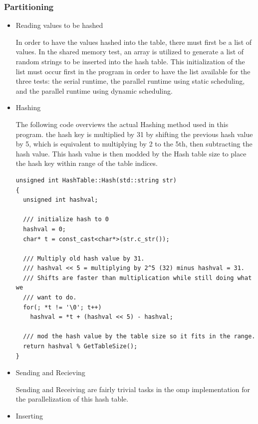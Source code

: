 \documentclass{article}
\begin{document}
\subsubsection{Partitioning}
        \begin{itemize}
            \item Reading values to be hashed
            
            In order to have the values hashed into the table, there must first be a list of values. In the shared memory test, 
            an array is utilized to generate a list of random strings to be inserted into the hash table. This initialization of 
            the list must occur first in the program in order to have the list available for the three tests: the serial runtime, 
            the parallel runtime using static scheduling, and the parallel runtime using dynamic scheduling.
            \item Hashing
            
            The following code overviews the actual Hashing method used in this program. the hash key is multiplied by 31 by 
            shifting the previous hash value by 5, which is equivalent to multiplying by 2 to the 5th, then subtracting the hash value. 
            This hash value is then modded by the Hash table size to place the hash key within range of the table indices.
            \begin{lstlisting}
unsigned int HashTable::Hash(std::string str)
{
  unsigned int hashval;

  /// initialize hash to 0
  hashval = 0;
  char* t = const_cast<char*>(str.c_str());

  /// Multiply old hash value by 31.
  /// hashval << 5 = multiplying by 2^5 (32) minus hashval = 31.
  /// Shifts are faster than multiplication while still doing what we
  /// want to do. 
  for(; *t != '\0'; t++)
    hashval = *t + (hashval << 5) - hashval;

  /// mod the hash value by the table size so it fits in the range.
  return hashval % GetTableSize();
}
	    \end{lstlisting}
            
            \item Sending and Recieving
            
            Sending and Receiving are fairly trivial tasks in the omp implementation for the parallelization of this hash table.
            \item Inserting
            

\end{itemize}
\end{document}
